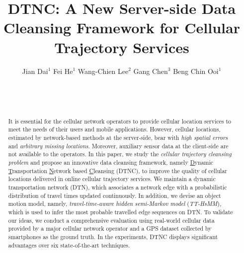 \documentclass{vldb}
\begin{document}
	
	\title{DTNC: A New Server-side Data Cleansing Framework for Cellular Trajectory Services}
	
	\author{
		\alignauthor
		Jian Dai$^{1}$\hspace{20pt} Fei He$^{1}$  \hspace{20pt}  Wang-Chien Lee$^{2}$\hspace{20pt} Gang Chen$^{3}$\hspace{20pt} Beng Chin Ooi$^{1}$\hspace{20pt}\\
		\\
		\\
		\\
	}
	
	
	\maketitle
	\begin{abstract}
	It is essential for the cellular network operators to provide cellular location services to meet the needs of their users and mobile applications. However, cellular locations, estimated by network-based methods at the server-side, bear with {\it high spatial errors} and {\it arbitrary missing locations}. Moreover, auxiliary sensor data at the client-side are not available to the operators. 
	In this paper, we study the {\em cellular trajectory cleansing problem} and propose an innovative data cleansing framework, namely \underline{D}ynamic \underline{T}ransportation \underline{N}etwork based \underline{C}leansing (DTNC), to improve the quality of cellular locations delivered in online cellular trajectory services. 
	We maintain a dynamic transportation network (DTN), which associates a network edge with a probabilistic distribution of travel times updated continuously. In addition, we devise an object motion model, namely, {\em travel-time-aware hidden semi-Markov model} ({\em TT-HsMM}), which is used to infer the most probable travelled edge sequences on DTN. 		
	To validate our ideas, we conduct a comprehensive evaluation using real-world cellular data provided by a major cellular network operator		
		and a GPS dataset collected by smartphones as the ground truth.
		In the experiments, DTNC displays significant advantages over six state-of-the-art techniques. 
		\end{abstract}
	
\end{document}
